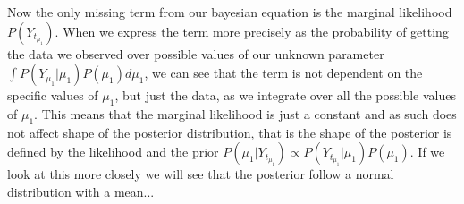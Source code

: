 \documentclass[12pt,a4paper,leqno]{report}
\theoremstyle{plain}
\theoremstyle{definition}
\theoremstyle{remark}
\begin{document}
Now the only missing term from our bayesian equation is the marginal likelihood \(P(Y_{t_{\mu_1}}) \).
When we express the term more precisely as the probability of getting the data we observed
over possible values of our unknown parameter \(\int P(Y_{\mu_1}|\mu_1)P(\mu_1) d\mu_1 \),
we can see that the term is not dependent on the specific values of \(\mu_1 \), but just the data,
as we integrate over all the possible values of \(\mu_1 \).
This means that the marginal likelihood is just a constant and as such does not affect shape of the posterior distribution,
that is the shape of the posterior is defined by the likelihood and the prior
\(P(\mu_1|Y_{t_{\mu_1}}) \propto P(Y_{t_{\mu_1}}|\mu_1)P(\mu_1) \). If we look at this more
closely we will see that the posterior follow a normal distribution with a mean...

\end{document}
